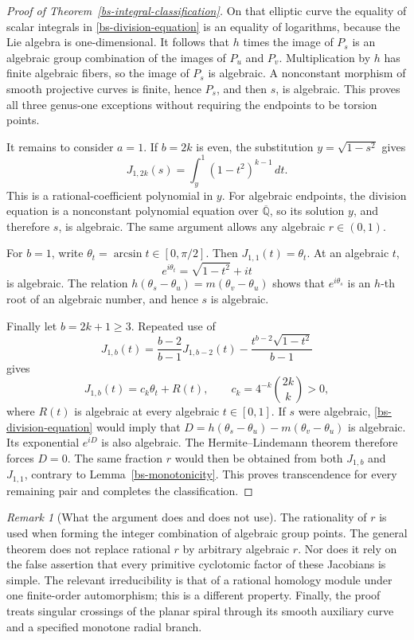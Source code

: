 \documentclass[11pt,a4paper]{article}
\theoremstyle{definition}
\theoremstyle{remark}
\newtheorem{remark}[theorem]{Remark}
\numberwithin{equation}{section}
\newcommand{\Qbar}{\overline{\mathbb Q}}
\begin{document}
\begin{proof}[Proof of Theorem~\ref{bs-integral-classification}]
On that elliptic curve the equality of scalar integrals in
\eqref{bs-division-equation} is an equality of logarithms, because
the Lie algebra is one-dimensional.  It follows that $h$ times the
image of $P_s$ is an algebraic group combination of the images of
$P_u$ and $P_v$.  Multiplication by $h$ has finite algebraic fibers,
so the image of $P_s$ is algebraic.  A nonconstant morphism of smooth
projective curves is finite, hence $P_s$, and then $s$, is algebraic.
This proves all three genus-one exceptions without requiring the
endpoints to be torsion points.

It remains to consider $a=1$.  If $b=2k$ is even, the substitution
$y=\sqrt{1-s^2}$ gives
\[
 J_{1,2k}(s)=\int_y^1(1-t^2)^{k-1}\,dt.
\]
This is a rational-coefficient polynomial in $y$.  For algebraic
endpoints, the division equation is a nonconstant polynomial equation
over $\Qbar$, so its solution $y$, and therefore $s$, is algebraic.
The same argument allows any algebraic $r\in(0,1)$.

For $b=1$, write $\theta_t=\arcsin t\in[0,\pi/2]$.
Then $J_{1,1}(t)=\theta_t$.  At an algebraic $t$,
\[
 e^{i\theta_t}=\sqrt{1-t^2}+it
\]
is algebraic.  The relation
$h(\theta_s-\theta_u)=m(\theta_v-\theta_u)$ shows that
$e^{i\theta_s}$ is an $h$-th root of an algebraic number, and hence
$s$ is algebraic.

Finally let $b=2k+1\ge3$.  Repeated use of
\begin{equation}
 J_{1,b}(t)=\frac{b-2}{b-1}J_{1,b-2}(t)
          -\frac{t^{b-2}\sqrt{1-t^2}}{b-1}
 \label{bs-odd-reduction}
\end{equation}
gives
\[
 J_{1,b}(t)=c_k\theta_t+R(t),\qquad
 c_k=4^{-k}\binom{2k}{k}>0,
\]
where $R(t)$ is algebraic at every algebraic $t\in[0,1]$.
If $s$ were algebraic, \eqref{bs-division-equation} would imply that
$D=h(\theta_s-\theta_u)-m(\theta_v-\theta_u)$ is algebraic.
Its exponential $e^{iD}$ is also algebraic.  The
Hermite--Lindemann theorem therefore forces $D=0$.
The same fraction $r$ would then be obtained from both $J_{1,b}$
and $J_{1,1}$, contrary to Lemma~\ref{bs-monotonicity}.
This proves transcendence for every remaining pair and completes the
classification.
\end{proof}

\begin{remark}[What the argument does and does not use]
\label{bs-proof-scope}
The rationality of $r$ is used when forming the integer combination of
algebraic group points.  The general theorem does not replace rational
$r$ by arbitrary algebraic $r$.  Nor does it rely on the false assertion
that every primitive cyclotomic factor of these Jacobians is simple.
The relevant irreducibility is that of a rational homology module under
one finite-order automorphism; this is a different property.  Finally,
the proof treats singular crossings of the planar spiral through its
smooth auxiliary curve and a specified monotone radial branch.
\end{remark}
\end{document}
